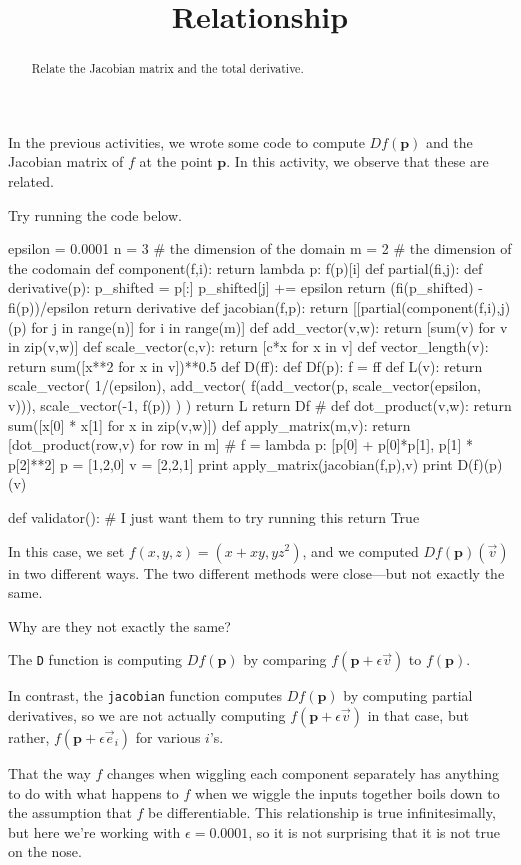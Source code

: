 \documentclass{ximera}
\title{Relationship}
\begin{document}
\begin{abstract}
  Relate the Jacobian matrix and the total derivative.
\end{abstract}

In the previous activities, we wrote some code to compute
$Df(\mathbf{p})$ and the Jacobian matrix of $f$ at the point
$\mathbf{p}$.  In this activity, we observe that these are related.

\begin{exercise}
Try running the code below.
\begin{solution}
    \begin{python}
epsilon = 0.0001
n = 3 # the dimension of the domain
m = 2 # the dimension of the codomain
def component(f,i):
  return lambda p: f(p)[i]
def partial(fi,j):
  def derivative(p):
    p_shifted = p[:]
    p_shifted[j] += epsilon
    return (fi(p_shifted) - fi(p))/epsilon
  return derivative
def jacobian(f,p):
  return [[partial(component(f,i),j)(p) for j in range(n)] for i in range(m)]
def add_vector(v,w):
  return [sum(v) for v in zip(v,w)]
def scale_vector(c,v):
  return [c*x for x in v]
def vector_length(v):
  return sum([x**2 for x in v])**0.5
def D(ff):
  def Df(p):
    f = ff
    def L(v):
      return scale_vector( 1/(epsilon),
                           add_vector( f(add_vector(p, scale_vector(epsilon, v))),
                                       scale_vector(-1, f(p)) ) )
    return L
  return Df
#
def dot_product(v,w):
  return sum([x[0] * x[1] for x in zip(v,w)])
def apply_matrix(m,v):
  return [dot_product(row,v) for row in m]
#
f = lambda p: [p[0] + p[0]*p[1], p[1] * p[2]**2]
p = [1,2,0]
v = [2,2,1]
print apply_matrix(jacobian(f,p),v)
print D(f)(p)(v)

def validator():
  # I just want them to try running this
  return True
    \end{python}
\end{solution}

In this case, we set $f(x,y,z) = (x + xy, yz^2)$, and we computed
$Df(\mathbf{p})(\vec{v})$ in two different ways.  The two different methods were close---but not exactly the same.

Why are they not exactly the same?
\begin{free-response}
  The \texttt{D} function is computing $Df(\mathbf{p})$ by comparing
  $f(\mathbf{p} + \epsilon \vec{v})$ to $f(\mathbf{p})$.

  In contrast, the \texttt{jacobian} function computes
  $Df(\mathbf{p})$ by computing partial derivatives, so we are not
  actually computing $f(\mathbf{p} + \epsilon \vec{v})$ in that case,
  but rather, $f(\mathbf{p} + \epsilon \vec{e}_i)$ for various $i$'s.

  That the way $f$ changes when wiggling each component separately has
  anything to do with what happens to $f$ when we wiggle the inputs
  together boils down to the assumption that $f$ be differentiable.
  This relationship is true infinitesimally, but here we're working
  with $\epsilon = 0.0001$, so it is not surprising that it is not
  true on the nose.
\end{free-response}

\end{exercise}
\end{document}
